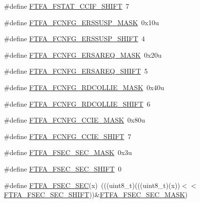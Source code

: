 \begin{DoxyCompactItemize}
\item 
\#define \hyperlink{group___f_t_f_a___register___masks_ga14a29b83c4f1b2e67a066799a46863f6}{F\+T\+F\+A\+\_\+\+F\+S\+T\+A\+T\+\_\+\+C\+C\+I\+F\+\_\+\+S\+H\+I\+FT}~7
\item 
\#define \hyperlink{group___f_t_f_a___register___masks_ga0fc6d10ebdf1a45172f3c8291fdee94c}{F\+T\+F\+A\+\_\+\+F\+C\+N\+F\+G\+\_\+\+E\+R\+S\+S\+U\+S\+P\+\_\+\+M\+A\+SK}~0x10u
\item 
\#define \hyperlink{group___f_t_f_a___register___masks_ga7586fcfe862202cd864fec542db66458}{F\+T\+F\+A\+\_\+\+F\+C\+N\+F\+G\+\_\+\+E\+R\+S\+S\+U\+S\+P\+\_\+\+S\+H\+I\+FT}~4
\item 
\#define \hyperlink{group___f_t_f_a___register___masks_gac92e8d3d354f7352b8bd61086327d16d}{F\+T\+F\+A\+\_\+\+F\+C\+N\+F\+G\+\_\+\+E\+R\+S\+A\+R\+E\+Q\+\_\+\+M\+A\+SK}~0x20u
\item 
\#define \hyperlink{group___f_t_f_a___register___masks_ga0879413588f696dfe9f6a1c849103753}{F\+T\+F\+A\+\_\+\+F\+C\+N\+F\+G\+\_\+\+E\+R\+S\+A\+R\+E\+Q\+\_\+\+S\+H\+I\+FT}~5
\item 
\#define \hyperlink{group___f_t_f_a___register___masks_gae9ad4a9aac7c5ef332e4c7d7af0a63a9}{F\+T\+F\+A\+\_\+\+F\+C\+N\+F\+G\+\_\+\+R\+D\+C\+O\+L\+L\+I\+E\+\_\+\+M\+A\+SK}~0x40u
\item 
\#define \hyperlink{group___f_t_f_a___register___masks_gaea7f60637733465718c684ca9c4612f6}{F\+T\+F\+A\+\_\+\+F\+C\+N\+F\+G\+\_\+\+R\+D\+C\+O\+L\+L\+I\+E\+\_\+\+S\+H\+I\+FT}~6
\item 
\#define \hyperlink{group___f_t_f_a___register___masks_gad7b9ee7d7ca0f897784ed211030e6e8f}{F\+T\+F\+A\+\_\+\+F\+C\+N\+F\+G\+\_\+\+C\+C\+I\+E\+\_\+\+M\+A\+SK}~0x80u
\item 
\#define \hyperlink{group___f_t_f_a___register___masks_ga7032f590fbfc9a43d13109688eb3a4c0}{F\+T\+F\+A\+\_\+\+F\+C\+N\+F\+G\+\_\+\+C\+C\+I\+E\+\_\+\+S\+H\+I\+FT}~7
\item 
\#define \hyperlink{group___f_t_f_a___register___masks_ga3f0ba5e4a511479878b0505bc098ec00}{F\+T\+F\+A\+\_\+\+F\+S\+E\+C\+\_\+\+S\+E\+C\+\_\+\+M\+A\+SK}~0x3u
\item 
\#define \hyperlink{group___f_t_f_a___register___masks_ga0c7032c13efe05ed6c6d86c42beb7a5f}{F\+T\+F\+A\+\_\+\+F\+S\+E\+C\+\_\+\+S\+E\+C\+\_\+\+S\+H\+I\+FT}~0
\item 
\#define \hyperlink{group___f_t_f_a___register___masks_gacb0f50c64228c78ff70896ffa68ec797}{F\+T\+F\+A\+\_\+\+F\+S\+E\+C\+\_\+\+S\+EC}(x)~(((uint8\+\_\+t)(((uint8\+\_\+t)(x))$<$$<$\hyperlink{group___f_t_f_a___register___masks_ga0c7032c13efe05ed6c6d86c42beb7a5f}{F\+T\+F\+A\+\_\+\+F\+S\+E\+C\+\_\+\+S\+E\+C\+\_\+\+S\+H\+I\+FT}))\&\hyperlink{group___f_t_f_a___register___masks_ga3f0ba5e4a511479878b0505bc098ec00}{F\+T\+F\+A\+\_\+\+F\+S\+E\+C\+\_\+\+S\+E\+C\+\_\+\+M\+A\+SK})
$$
\end{DoxyCompactItemize}
